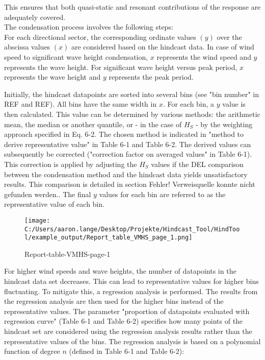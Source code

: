 This ensures that both quasi-static and resonant contributions of the response are adequately covered.\\
The condensation process involves the following steps:\\
For each directional sector, the corresponding ordinate values $(y)$ over the abscissa values $(x)$ are considered based on the hindcast data. In case of wind speed to significant wave height condensation, $x$ represents the wind speed and $y$ represents the wave height. For significant wave height versus peak period, $x$ represents the wave height and $y$ represents the peak period.

Initially, the hindcast datapoints are sorted into several bins (see "bin number" in REF and REF). All bins have the same width in $x$. For each bin, a $y$ value is then calculated. This value can be determined by various methods: the arithmetic mean, the median or another quantile, or - in the case of $H_{S}$ - by the weighting approach specified in Eq. 6-2. The chosen method is indicated in "method to derive representative value" in Table 6-1 and Table 6-2. The derived values can subsequently be corrected ("correction factor on averaged values" in Table 6-1). This correction is applied by adjusting the $H_{S}$ values if the DEL comparison between the condensation method and the hindcast data yields unsatisfactory results. This comparison is detailed in section Fehler! Verweisquelle konnte nicht gefunden werden.. The final $y$ values for each bin are referred to as the representative value of each bin.

\begin{figure}[H] 
 \centering 
 \texttt{[image: C:/Users/aaron.lange/Desktop/Projekte/Hindcast\_Tool/HindTool/example\_output/Report\_table\_VMHS\_page\_1.png]} 
 \captionsetup{type=table} 
\caption{ Report-table-VMHS-page-1 } 
 \label{tab: Report_table_VMHS_page_1 } 
\end{figure}

For higher wind speeds and wave heights, the number of datapoints in the hindcast data set decreases. This can lead to representative values for higher bins fluctuating. To mitigate this, a regression analysis is performed. The results from the regression analysis are then used for the higher bins instead of the representative values. The parameter "proportion of datapoints evaluated with regression curve" (Table 6-1 and Table 6-2) specifies how many points of the hindcast set are considered using the regression analysis results rather than the representative values of the bins. The regression analysis is based on a polynomial function of degree $n$ (defined in Table 6-1 and Table 6-2):

